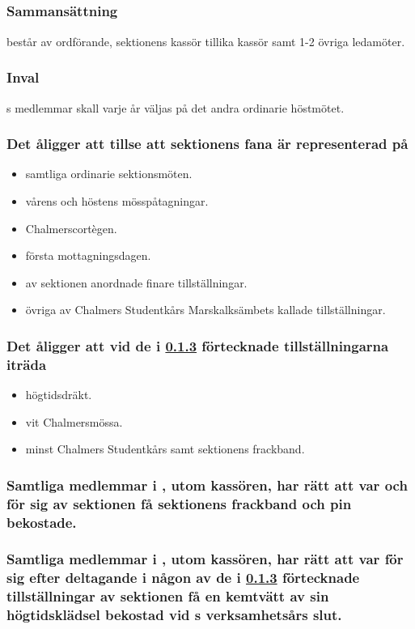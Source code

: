 \subsection{\FANBARERITFULL}
\subsubsection{Sammansättning}
\FANBARERIT{} består av ordförande, sektionens kassör tillika kassör samt 1-2 övriga ledamöter.

\subsubsection{Inval}
\FANBARERIT{}s medlemmar skall varje år väljas på det andra ordinarie höstmötet.

\subsubsection{Det åligger \FANBARERIT att tillse att sektionens fana är representerad på}
\label{sec:fanbarerit:function}
\begin{itemize}
	\item samtliga ordinarie sektionsmöten.
	\item vårens och höstens mösspåtagningar.
	\item Chalmerscortègen.
	\item första mottagningsdagen.
	\item av sektionen anordnade finare tillställningar.
	\item övriga av Chalmers Studentkårs Marskalksämbets kallade tillställningar.
\end{itemize}

\subsubsection{Det åligger \FANBARERIT{} att vid de i \ref{sec:fanbarerit:function} förtecknade tillställningarna iträda}
\begin{itemize}
	\item högtidsdräkt.
	\item vit Chalmersmössa.
	\item minst Chalmers Studentkårs samt sektionens frackband.
\end{itemize}

\subsubsection{Samtliga medlemmar i \FANBARERIT{}, utom kassören, har rätt att var och för sig av sektionen få sektionens frackband och pin bekostade.}

\subsubsection{Samtliga medlemmar i \FANBARERIT{}, utom kassören, har rätt att var för sig efter deltagande i någon av de i \ref{sec:fanbarerit:function} förtecknade tillställningar av sektionen få en kemtvätt av sin högtidsklädsel bekostad vid \FANBARERIT{}s verksamhetsårs slut.}

